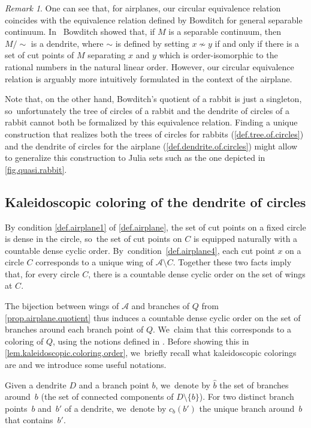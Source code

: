\documentclass[JEP,XML,SOM,Unicode,NoFloatCountersInSection,published]{cedram}
\theoremstyle{plain}
\theoremstyle{definition}
\theoremstyle{remark}
\newtheorem{remark}[theorem]{Remark}
\newcommand{\A}{\mathcal{A}}
\begin{document}
\begin{remark}
One can see that, for airplanes, our circular equivalence relation coincides with the equivalence relation defined by Bowditch for general separable continuum. In~\cite[Th.\,5.23]{Bowditch} Bowditch showed that, if $M$ is a separable continuum, then $M / \sim$ is a dendrite, where $\sim$ is defined by setting $x \not\sim y$ if and only if there is a set of cut points of $M$ separating $x$ and $y$ which is order-isomorphic to the rational numbers in the natural linear order.
However, our circular equivalence relation is arguably more intuitively formulated in the context of the airplane.

Note that, on the other hand, Bowditch's quotient of a rabbit is just a singleton, so~unfortunately the tree of circles of a rabbit and the dendrite of circles of a rabbit cannot both be formalized by this equivalence relation.
Finding a unique construction that realizes both the trees of circles for rabbits (\cref{def.tree.of.circles}) and the dendrite of circles for the airplane (\cref{def.dendrite.of.circles}) might allow to generalize this construction to Julia sets such as the one depicted in \cref{fig.quasi.rabbit}.
\end{remark}

\subsection{Kaleidoscopic coloring of the dendrite of circles}

By condition \cref{def.airplane1} of \cref{def.airplane}, the set of cut points on a fixed circle is dense in the circle, so~the set of cut points on $C$ is equipped naturally with a countable dense cyclic order. By~condition~\cref{def.airplane4}, each cut point $x$ on a circle $C$ corresponds to a unique wing of $\A \setminus C$.
Together these two facts imply that, for every circle $C$, there is a countable dense cyclic order on the set of wings at $C$.

The bijection between wings of $\A$ and branches of $Q$ from \cref{prop.airplane.quotient} thus induces a countable dense cyclic order on the set of branches around each branch point of $Q$. We~claim that this corresponds to a coloring of $Q$, using the notions defined in \cite{Kaleidoscopic}.
Before showing this in \cref{lem.kaleidoscopic.coloring.order}, we~briefly recall what kaleidoscopic colorings are and we introduce some useful notations.

Given a dendrite $D$ and a branch point $b$, we~denote by $\hat{b}$ the set of branches around~$b$ (\ie the set of connected components of $D \setminus \{b\}$).
For two distinct branch points~$b$ and~$b'$ of a dendrite, we~denote by $c_b(b')$ the unique branch around~$b$ that contains~$b'$.
\end{document}

